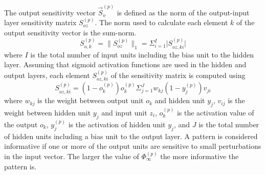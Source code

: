 \documentclass[conference]{IEEEtran}
\begin{document}
	The output sensitivity vector $\vec{S}_o^{(p)}$ is defined as the norm of the output-input layer sensitivity matrix $S_{oz}^{(p)}$. The norm used to calculate each element $k$ of the output sensitivity vector is the sum-norm.
	$$
	S_{o,k}^{(p)}=\lVert S_{oz}^{(p)}\lVert_1 = \Sigma_{i=1}^I \lvert S_{oz,ki}^{(p)}\lvert
	$$
	where $I$ is the total number of input units including the bias unit to the hidden layer.
	Assuming that sigmoid activation functions are used in the hidden and output layers, each element $S_{oz,ki}^{(p)}$ of the sensitivity matrix is computed using
	$$
	S_{oz,ki}^{(p)}=(1-o_k^{(p)})o_k^{(p)}\Sigma_{j=1}^Jw_{kj}(1-y_j^{(p)})v_{ji}
	$$
	where $w_{kj}$ is the weight between output unit $o_k$ and hidden unit $y_j$, $v_{ij}$ is the weight between hidden unit $y_j$ and input unit $z_{i}$, $o_k^{(p)}$ is the activation value of the output $o_k$, $y_j^{(p)}$ is the activation of hidden unit $y_j$, and $J$ is the total number of hidden units including a bias unit to the output layer.
	A pattern is considered informative if one or more of the output units are sensitive to small perturbations in the input vector. The larger the value of $\Phi_\infty^{(p)}$ the more informative the pattern is.
	
\end{document}
